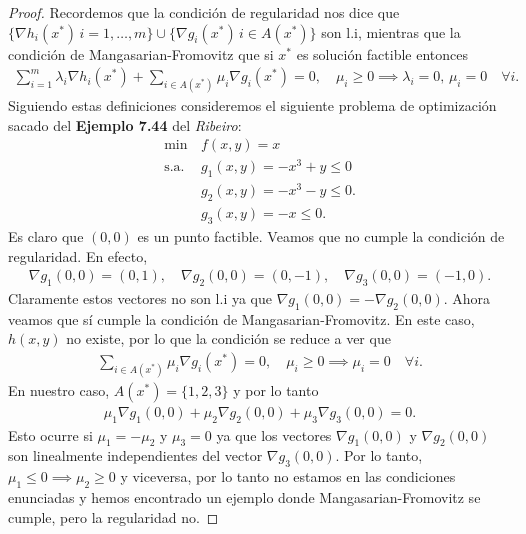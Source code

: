 \documentclass{article}
\begin{document}
\begin{proof}
    Recordemos que la condición de regularidad nos dice que \( \{ \nabla h_i(x^*)\, i =1,\ldots, m\} \cup \{ \nabla g_i(x^*) \, i\in A(x^*) \} \) son l.i, mientras que la condición de Mangasarian-Fromovitz
    que si \( x^* \) es solución factible entonces \begin{align*}
        \sum_{i=1}^{m} \lambda_i \nabla h_i (x^*) + \sum_{i \in A(x^*)} \mu_i \nabla g_i (x^*) = 0, \quad \mu_i \geq 0 \implies \lambda_i = 0, \, \mu_i = 0 \quad \forall i.
    \end{align*}
    Siguiendo estas definiciones consideremos el siguiente problema de optimización sacado del \textbf{Ejemplo 7.44} del \emph{Ribeiro}: \begin{align*}
        \min \,      & f(x, y) = x                  \\
        \text{s.a. } & g_1(x, y) = -x^3 + y \leq 0  \\
                     & g_2(x, y) = -x^3 - y \leq 0. \\
                     & g_3(x, y) = -x \leq 0.
    \end{align*}
    Es claro que \( (0, 0) \) es un punto factible. Veamos que no cumple la condición de regularidad. En efecto, \begin{align*}
        \nabla g_1(0, 0) = (0, 1), \quad \nabla g_2(0, 0) = (0, -1), \quad \nabla g_3(0, 0) = (-1, 0).
    \end{align*}
    Claramente estos vectores no son l.i ya que \( \nabla g_1(0, 0) = - \nabla g_2(0, 0) \). Ahora veamos que sí cumple la condición de Mangasarian-Fromovitz.
    En este caso, \( h(x, y) \) no existe, por lo que la condición se reduce a ver que \begin{align*}
        \sum_{i \in A(x^*)} \mu_i \nabla g_i (x^*) = 0, \quad \mu_i \geq 0 \implies \mu_i = 0 \quad \forall i.
    \end{align*}
    En nuestro caso, \( A(x^*) = \{ 1, 2, 3 \} \) y por lo tanto \begin{align*}
        \mu_1 \nabla g_1(0, 0) + \mu_2 \nabla g_2(0, 0) + \mu_3 \nabla g_3(0, 0) = 0.
    \end{align*}
    Esto ocurre si \( \mu_1 = -\mu_2 \) y \( \mu_3 = 0 \) ya que los vectores \( \nabla g_1(0, 0) \) y \( \nabla g_2(0, 0) \) son linealmente independientes del vector \( \nabla g_3(0, 0) \).
    Por lo tanto, \( \mu_1 \leq 0 \implies \mu_2 \geq 0 \) y viceversa, por lo tanto no estamos en las condiciones enunciadas y hemos encontrado un ejemplo donde Mangasarian-Fromovitz se cumple, pero la regularidad no.
\end{proof}
\end{document}
